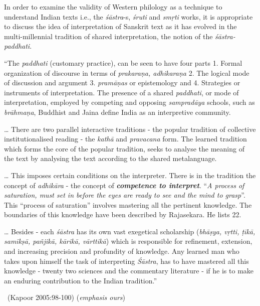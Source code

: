 In order to examine the validity of Western philology as a technique to understand Indian texts i.e., the \textit{śāstra}-s, \textit{śruti} and \textit{smṛti} works, it is appropriate to discuss the idea of interpretation of Sanskrit text as it has evolved in the multi-millennial tradition of shared interpretation, the notion of the \textit{śāstra-paddhati}.

\begin{myquote}
“The \textit{paddhati} (customary practice), can be seen to have four parts 1. Formal organization of discourse in terms of \textit{prakaraṇa, adhikaraṇa} 2. The logical mode of discussion and argument 3. \textit{pramāṇas} or epistemology and 4. Strategies or instruments of interpretation. The presence of a shared \textit{paddhati}, or mode of interpretation, employed by competing and opposing \textit{sampradāya} schools, such as \textit{brāhmaṇa}, Buddhist and Jaina define India as an interpretive community.
\end{myquote}

\begin{myquote}
… There are two parallel interactive traditions - the popular tradition of collective institutionalised reading - the \textit{kathā} and \textit{pravacana} form. The learned tradition which forms the core of the popular tradition, seeks to analyse the meaning of the text by analysing the text according to the shared metalanguage.
\end{myquote}

\begin{myquote}
… This imposes certain conditions on the interpreter. There is in the tradition the concept of \textit{adhikāra} - the concept of \textbf{\textit{competence to interpret}}. “\textit{A process of saturation, must set in before the eyes are ready to see and the mind to grasp}”. This “process of saturation” involves mastering all the pertinent knowledge. The boundaries of this knowledge have been described by Rajasekara. He lists 22.
\end{myquote}

\begin{myquote}
… Besides - each \textit{śāstra} has its own vast exegetical scholarship (\textit{bhāṣya, vṛtti, ṭīkā, samīkṣā, pañjikā, kārikā, vārttikā}) which is responsible for refinement, extension, and increasing precision and profundity of knowledge. Any learned man who takes upon himself the task of interpreting \textit{Śāstra}, has to have mastered all this knowledge - twenty two sciences and the commentary literature - if he is to make an enduring contribution to the Indian tradition.”

~\hfill (Kapoor 2005:98-100) (\textit{emphasis ours})
\end{myquote}

